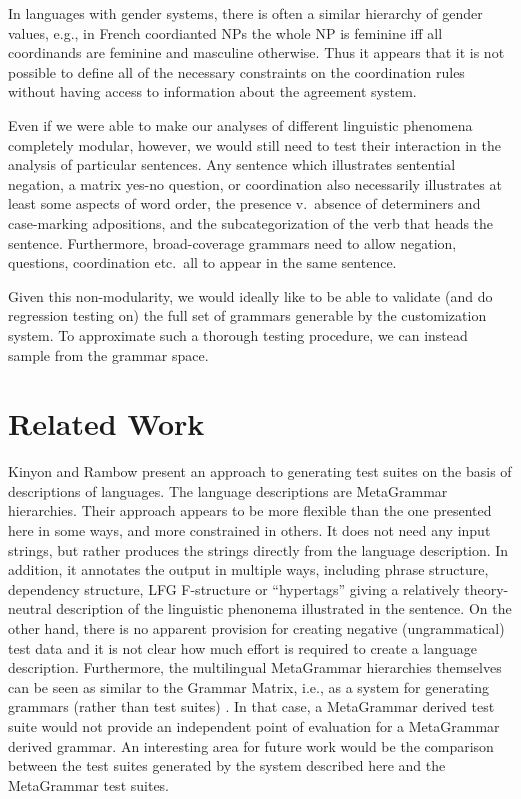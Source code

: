 \documentclass[11pt]{article}
\begin{document}
%
In languages with gender systems, there is often a similar hierarchy
of gender values, e.g., in French coordianted NPs the whole NP is feminine
iff all coordinands are feminine and masculine otherwise.  Thus
it appears that it is not possible to define all of the necessary
constraints on the coordination rules without having access to information
about the agreement system.  

Even if we were able to make our analyses of different linguistic
phenomena completely modular, however, we would still need to test
their interaction in the analysis of particular sentences.
Any sentence which illustrates sentential negation, a matrix yes-no
question, or coordination also necessarily illustrates at least some
aspects of word order, the presence v.\ absence of determiners and
case-marking adpositions, and the subcategorization of the verb that
heads the sentence.  Furthermore, broad-coverage grammars need to
allow negation, questions, coordination etc.\ all to appear in the
same sentence.

Given this non-modularity, we would ideally like to be able to
validate (and do regression testing on) the full set of grammars
generable by the customization system.  To approximate such a thorough
testing procedure, we can instead sample from the grammar space.

\section{Related Work}
\label{rw}

Kinyon and Rambow  present an approach to
generating test suites on the basis of descriptions of languages.  The
language descriptions are MetaGrammar hierarchies. Their approach
appears to be more flexible than the one presented here in some ways,
and more constrained in others.  It does not need any input strings,
but rather produces the strings directly from the language
description. In addition, it annotates the output in multiple ways,
including phrase structure, dependency structure, LFG F-structure or
``hypertags'' giving a relatively theory-neutral description of the
linguistic phenonema illustrated in the sentence.  On the other hand,
there is no apparent provision for creating negative (ungrammatical)
test data and it is not clear how much effort is required to create a
language description.  Furthermore, the multilingual MetaGrammar
hierarchies themselves can be seen as similar to the Grammar Matrix,
i.e., as a system for generating grammars (rather than test suites)
\cite{Kin:Ram:Sch:Yoo:Jos:06}.  In that case, a MetaGrammar derived
test suite would not provide an independent point of evaluation for a
MetaGrammar derived grammar.  An interesting area for future work
would be the comparison between the test suites generated by the
system described here and the MetaGrammar test suites.
\end{document}
